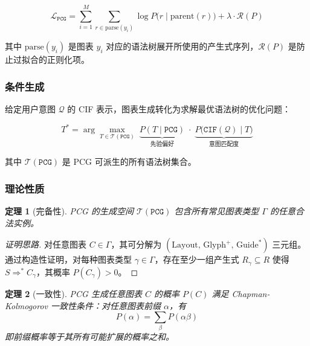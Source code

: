 \documentclass[12pt,a4paper]{ctexart}
\newtheorem{theorem}{定理}[section]
\theoremstyle{remark}
\newcommand{\CIF}{\texttt{CIF}}
\newcommand{\PCG}{\texttt{PCG}}
\begin{document}
\begin{equation}\label{eq:pcloss}
    \mathcal{L}_{\PCG} = \sum_{i=1}^{M} \sum_{r \in \text{parse}(y_i)} \log P\big(r \mid \text{parent}(r)\big) + \lambda \cdot \mathcal{R}(P)
\end{equation}

其中 $\text{parse}(y_i)$ 是图表 $y_i$ 对应的语法树展开所使用的产生式序列，$\mathcal{R}(P)$ 是防止过拟合的正则化项。

\subsubsection{条件生成}

给定用户意图 $\mathcal{Q}$ 的 CIF 表示，图表生成转化为求解最优语法树的优化问题：

\begin{equation}\label{eq:conditional}
    T^* = \arg\max_{T \in \mathcal{T}(\PCG)} \;
          \underbrace{P(T \mid \PCG)}_{\text{先验偏好}} \;\cdot\;
          \underbrace{P\big(\CIF(\mathcal{Q}) \mid T\big)}_{\text{意图匹配度}}
\end{equation}

其中 $\mathcal{T}(\PCG)$ 是 PCG 可派生的所有语法树集合。

\subsubsection{理论性质}

\begin{theorem}[完备性]\label{thm:completeness}
PCG 的生成空间 $\mathcal{T}(\PCG)$ 包含所有常见图表类型 $\Gamma$ 的任意合法实例。
\end{theorem}

\begin{proof}[证明思路]
对任意图表 $C \in \Gamma$，其可分解为 $(\text{Layout},\, \text{Glyph}^+,\, \text{Guide}^*)$ 三元组。通过构造性证明，对每种图表类型 $\gamma \in \Gamma$，存在至少一组产生式 $R_\gamma \subseteq R$ 使得 $S \Rightarrow^* C_\gamma$，其概率 $P(C_\gamma) > 0$。
\end{proof}

\begin{theorem}[一致性]\label{thm:consistency}
PCG 生成任意图表 $C$ 的概率 $P(C)$ 满足 Chapman-Kolmogorov 一致性条件：对任意图表前缀 $\alpha$，有
\begin{equation}
    P(\alpha) = \sum_{\beta} P(\alpha\beta)
\end{equation}
即前缀概率等于其所有可能扩展的概率之和。
\end{theorem}
\end{document}
